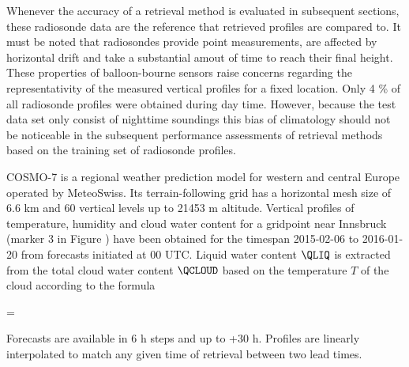     Whenever the accuracy of a retrieval method is evaluated in subsequent
    sections, these radiosonde data are the reference that retrieved profiles
    are compared to. It must be noted that radiosondes provide point
    measurements, are affected by horizontal drift and take a substantial amout
    of time to reach their final height. These properties of balloon-bourne
    sensors raise concerns regarding the representativity of the measured
    vertical profiles for a fixed location. Only 4 \% of all radiosonde
    profiles were obtained during day time. However, because the test data set
    only consist of nighttime soundings this bias of climatology should not be
    noticeable in the subsequent performance assessments of retrieval methods
    based on the training set of radiosonde profiles.


\stopsection

    {\externalfigure[map][width=\textwidth]}


\startsection[title=COSMO-7 Simulated Soundings]

    COSMO-7 is a regional weather prediction model for western and central
    Europe operated by MeteoSwiss. Its terrain-following grid has a
    horizontal mesh size of 6.6 km and 60 vertical levels up to 21453
    m altitude. Vertical profiles of temperature, humidity and cloud water
    content for a gridpoint near Innsbruck (marker 3 in Figure
    ) have been obtained for the timespan 2015-02-06 to
    2016-01-20 from forecasts initiated at 00 UTC. Liquid water content
    $\QLIQ$ is extracted from the total cloud water content $\QCLOUD$ based on
    the temperature $T$ of the cloud according to the formula

    \startformula
        \QLIQ = \QCLOUD \startcases
              \, \KELVIN \le \TEMP \NR
            \NC {}
                 \, \KELVIN \lt \TEMP {} \, \KELVIN \EQSTOP \NR
              \, \KELVIN \le \TEMP \NR
        \stopcases
    \stopformula

    Forecasts are available in 6 h steps and up to +30 h. Profiles are linearly
    interpolated to match any given time of retrieval between two lead times.

